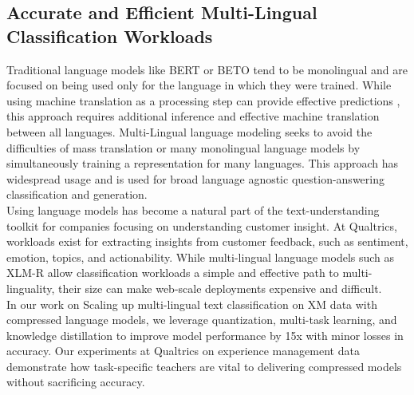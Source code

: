 \subsection{Accurate and Efficient Multi-Lingual Classification Workloads}
Traditional language models like BERT \cite{Devlin2019BERTPO} or BETO \cite{canete-etal-2022-albeto} tend to be monolingual and are focused on being used only for the language in which they were trained. While using machine translation as a processing step can provide effective predictions \cite{Isbister2021ShouldWS}, this approach requires additional inference and effective machine translation between all languages. Multi-Lingual language modeling seeks to avoid the difficulties of mass translation or many monolingual language models by simultaneously training a representation for many languages. This approach has widespread usage and is used for broad language agnostic question-answering classification and generation. \\
Using language models has become a natural part of the text-understanding toolkit for companies focusing on understanding customer insight. At Qualtrics, workloads exist for extracting insights from customer feedback, such as sentiment, emotion, topics, and actionability. While multi-lingual language models such as XLM-R \cite{Conneau2020UnsupervisedCR} allow classification workloads a simple and effective path to multi-linguality, their size can make web-scale deployments expensive and difficult. \\ 
In our work on Scaling up multi-lingual text classification on XM data with compressed language
models, \cite{Campos2022ScalM} we leverage quantization, multi-task learning, and knowledge distillation to improve model performance by 15x with minor losses in accuracy. Our experiments at Qualtrics on experience management data demonstrate how task-specific teachers are vital to delivering compressed models without sacrificing accuracy.
